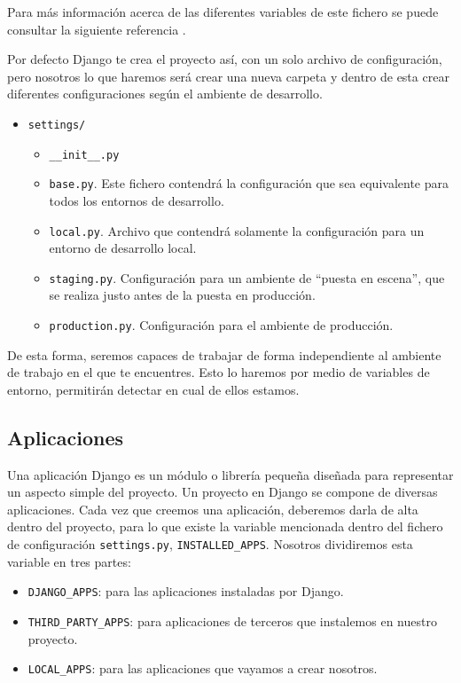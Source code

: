 Para más información acerca de las diferentes variables de este fichero se puede consultar la siguiente referencia \cite{DjSett}.

Por defecto Django te crea el proyecto así, con un solo archivo de configuración, pero nosotros lo que haremos será crear una nueva carpeta y dentro de esta crear diferentes configuraciones según el ambiente de desarrollo.

\begin{itemize}
	\item \texttt{settings/}
	\begin{itemize}
		\item \texttt{\_\_init\_\_.py}
		\item \texttt{base.py}. Este fichero contendrá la configuración que sea equivalente para todos los entornos de desarrollo.
		\item \texttt{local.py}. Archivo que contendrá solamente la configuración para un entorno de desarrollo local.
		\item \texttt{staging.py}. Configuración para un ambiente de ``puesta en escena'', que se realiza justo antes de la puesta en producción.
		\item \texttt{production.py}. Configuración para el ambiente de producción.
	\end{itemize}
\end{itemize}

De esta forma, seremos capaces de trabajar de forma independiente al ambiente de trabajo en el que te encuentres. Esto lo haremos por medio de variables de entorno, permitirán detectar en cual de ellos estamos.

\subsection{Aplicaciones}
Una aplicación Django es un módulo o librería pequeña diseñada para representar un aspecto simple del proyecto. Un proyecto en Django se compone de diversas aplicaciones. Cada vez que creemos una aplicación, deberemos darla de alta dentro del proyecto, para lo que existe la variable mencionada dentro del fichero de configuración \texttt{settings.py}, \texttt{INSTALLED\_APPS}. Nosotros dividiremos esta variable en tres partes:

\begin{itemize}
	\item \texttt{DJANGO\_APPS}: para las aplicaciones instaladas por Django.
	\item \texttt{THIRD\_PARTY\_APPS}: para aplicaciones de terceros que instalemos en nuestro proyecto.
	\item \texttt{LOCAL\_APPS}: para las aplicaciones que vayamos a crear nosotros.
\end{itemize}

